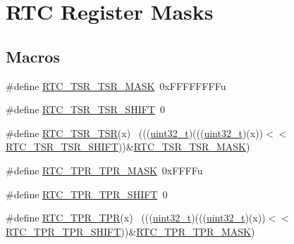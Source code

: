\hypertarget{group___r_t_c___register___masks}{}\section{R\+TC Register Masks}
\label{group___r_t_c___register___masks}
\subsection*{Macros}
\begin{DoxyCompactItemize}
\item 
\#define \hyperlink{group___r_t_c___register___masks_ga9a0f8842e8262ca176fcf028982153af}{R\+T\+C\+\_\+\+T\+S\+R\+\_\+\+T\+S\+R\+\_\+\+M\+A\+SK}~0x\+F\+F\+F\+F\+F\+F\+F\+Fu
\item 
\#define \hyperlink{group___r_t_c___register___masks_gad0476d1e39a866b5b5ba4728b55e258a}{R\+T\+C\+\_\+\+T\+S\+R\+\_\+\+T\+S\+R\+\_\+\+S\+H\+I\+FT}~0
\item 
\#define \hyperlink{group___r_t_c___register___masks_ga77fdb2a31f6b8644e3784f5cd65bb52b}{R\+T\+C\+\_\+\+T\+S\+R\+\_\+\+T\+SR}(x)                                                  ~(((\hyperlink{_p_e___types_8h_a33594304e786b158f3fb30289278f5af}{uint32\+\_\+t})(((\hyperlink{_p_e___types_8h_a33594304e786b158f3fb30289278f5af}{uint32\+\_\+t})(x))$<$$<$\hyperlink{group___r_t_c___register___masks_gad0476d1e39a866b5b5ba4728b55e258a}{R\+T\+C\+\_\+\+T\+S\+R\+\_\+\+T\+S\+R\+\_\+\+S\+H\+I\+FT}))\&\hyperlink{group___r_t_c___register___masks_ga9a0f8842e8262ca176fcf028982153af}{R\+T\+C\+\_\+\+T\+S\+R\+\_\+\+T\+S\+R\+\_\+\+M\+A\+SK})
\item 
\#define \hyperlink{group___r_t_c___register___masks_ga2682f687fa561be2f002fc574d48cc79}{R\+T\+C\+\_\+\+T\+P\+R\+\_\+\+T\+P\+R\+\_\+\+M\+A\+SK}~0x\+F\+F\+F\+Fu
\item 
\#define \hyperlink{group___r_t_c___register___masks_ga624a290f73478b3ca2687ac49cc78fb2}{R\+T\+C\+\_\+\+T\+P\+R\+\_\+\+T\+P\+R\+\_\+\+S\+H\+I\+FT}~0
\item 
\#define \hyperlink{group___r_t_c___register___masks_gaa16b7c11dc2683ecd02be0f187100e98}{R\+T\+C\+\_\+\+T\+P\+R\+\_\+\+T\+PR}(x)                                                  ~(((\hyperlink{_p_e___types_8h_a33594304e786b158f3fb30289278f5af}{uint32\+\_\+t})(((\hyperlink{_p_e___types_8h_a33594304e786b158f3fb30289278f5af}{uint32\+\_\+t})(x))$<$$<$\hyperlink{group___r_t_c___register___masks_ga624a290f73478b3ca2687ac49cc78fb2}{R\+T\+C\+\_\+\+T\+P\+R\+\_\+\+T\+P\+R\+\_\+\+S\+H\+I\+FT}))\&\hyperlink{group___r_t_c___register___masks_ga2682f687fa561be2f002fc574d48cc79}{R\+T\+C\+\_\+\+T\+P\+R\+\_\+\+T\+P\+R\+\_\+\+M\+A\+SK})

\end{DoxyCompactItemize}
